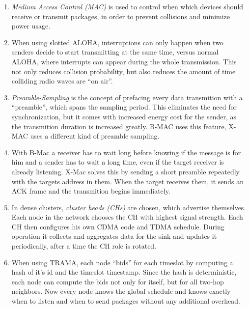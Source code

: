 

\date{Monday, 31.05.2020}


    \maketitle
    \thispagestyle{fancy}

    \begin{enumerate}
        \item \emph{Medium Access Control (MAC)} is used to control when which devices should receive or transmit packages, in order to prevent collisions and minimize power usage.
        \item When using slotted ALOHA, interruptions can only happen when two senders decide to start transmitting at the same time, versus normal ALOHA, where interrupts can appear during the whole transmission. This not only reduces collision probability, but also reduces the amount of time colliding radio waves are ``on air''.
        \item \emph{Preamble-Sampling} is the concept of prefacing every data transmition with a ``preamble'', which spans the sampling period. This eliminates the need for synchronization, but it comes with increased energy cost for the sender, as the transmition duration is increased greatly. B-MAC uses this feature, X-MAC uses a different kind of preamble sampling.
        \item With B-Mac a receiver has to wait long before knowing if the message is for him and a sender has to wait a long time, even if the target receiver is already listening. X-Mac solves this by sending a short preamble repeatedly with the targets address in them. When the target receives them, it sends an ACK frame and the transmition begins immediately.
        \item In dense clusters, \emph{cluster heads (CHs)} are chosen, which advertise themselves. Each node in the network chooses the CH with highest signal strength. Each CH then configures his own CDMA code and TDMA schedule. During operation it collects and aggregates data for the sink and updates it periodically, after a time the CH role is rotated.
        \item When using TRAMA, each node ``bids'' for each timeslot by computing a hash of it's id and the timeslot timestamp. Since the hash is deterministic, each node can compute the bids not only for itself, but for all two-hop neighbors. Now every node knows the global schedule and knows exactly when to listen and when to send packages without any additional overhead.
    \end{enumerate}

